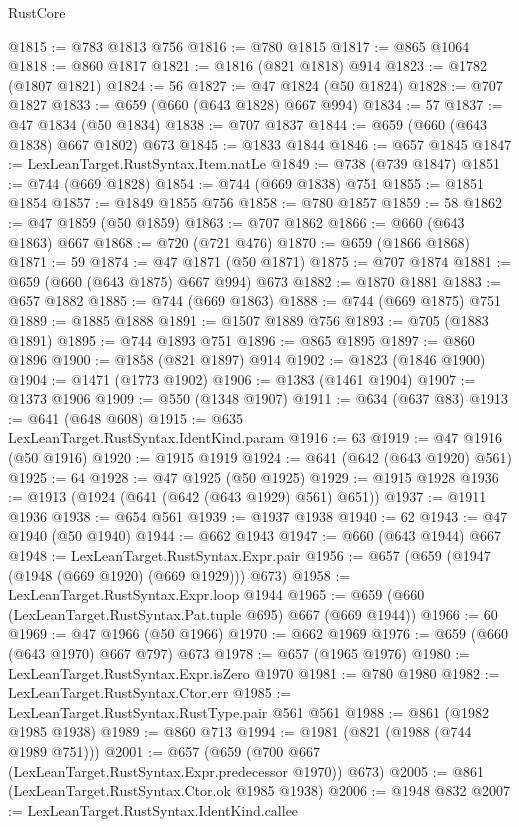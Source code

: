 \begin{lexlean}{RustCore}
\begin{coremodule}
@1815 := @783 @1813 @756
@1816 := @780 @1815
@1817 := @865 @1064
@1818 := @860 @1817
@1821 := @1816 (@821 @1818) @914
@1823 := @1782 (@1807 @1821)
@1824 := 56
@1827 := @47 @1824 (@50 @1824)
@1828 := @707 @1827
@1833 := @659 (@660 (@643 @1828) @667 @994)
@1834 := 57
@1837 := @47 @1834 (@50 @1834)
@1838 := @707 @1837
@1844 := @659 (@660 (@643 @1838) @667 @1802) @673
@1845 := @1833 @1844
@1846 := @657 @1845
@1847 := LexLeanTarget.RustSyntax.Item.natLe
@1849 := @738 (@739 @1847)
@1851 := @744 (@669 @1828)
@1854 := @744 (@669 @1838) @751
@1855 := @1851 @1854
@1857 := @1849 @1855 @756
@1858 := @780 @1857
@1859 := 58
@1862 := @47 @1859 (@50 @1859)
@1863 := @707 @1862
@1866 := @660 (@643 @1863) @667
@1868 := @720 (@721 @476)
@1870 := @659 (@1866 @1868)
@1871 := 59
@1874 := @47 @1871 (@50 @1871)
@1875 := @707 @1874
@1881 := @659 (@660 (@643 @1875) @667 @994) @673
@1882 := @1870 @1881
@1883 := @657 @1882
@1885 := @744 (@669 @1863)
@1888 := @744 (@669 @1875) @751
@1889 := @1885 @1888
@1891 := @1507 @1889 @756
@1893 := @705 (@1883 @1891)
@1895 := @744 @1893 @751
@1896 := @865 @1895
@1897 := @860 @1896
@1900 := @1858 (@821 @1897) @914
@1902 := @1823 (@1846 @1900)
@1904 := @1471 (@1773 @1902)
@1906 := @1383 (@1461 @1904)
@1907 := @1373 @1906
@1909 := @550 (@1348 @1907)
@1911 := @634 (@637 @83)
@1913 := @641 (@648 @608)
@1915 := @635 LexLeanTarget.RustSyntax.IdentKind.param
@1916 := 63
@1919 := @47 @1916 (@50 @1916)
@1920 := @1915 @1919
@1924 := @641 (@642 (@643 @1920) @561)
@1925 := 64
@1928 := @47 @1925 (@50 @1925)
@1929 := @1915 @1928
@1936 := @1913 (@1924 (@641 (@642 (@643 @1929) @561) @651))
@1937 := @1911 @1936
@1938 := @654 @561
@1939 := @1937 @1938
@1940 := 62
@1943 := @47 @1940 (@50 @1940)
@1944 := @662 @1943
@1947 := @660 (@643 @1944) @667
@1948 := LexLeanTarget.RustSyntax.Expr.pair
@1956 := @657 (@659 (@1947 (@1948 (@669 @1920) (@669 @1929))) @673)
@1958 := LexLeanTarget.RustSyntax.Expr.loop @1944
@1965 := @659 (@660 (LexLeanTarget.RustSyntax.Pat.tuple @695) @667 (@669 @1944))
@1966 := 60
@1969 := @47 @1966 (@50 @1966)
@1970 := @662 @1969
@1976 := @659 (@660 (@643 @1970) @667 @797) @673
@1978 := @657 (@1965 @1976)
@1980 := LexLeanTarget.RustSyntax.Expr.isZero @1970
@1981 := @780 @1980
@1982 := LexLeanTarget.RustSyntax.Ctor.err
@1985 := LexLeanTarget.RustSyntax.RustType.pair @561 @561
@1988 := @861 (@1982 @1985 @1938)
@1989 := @860 @713
@1994 := @1981 (@821 (@1988 (@744 @1989 @751)))
@2001 := @657 (@659 (@700 @667 (LexLeanTarget.RustSyntax.Expr.predecessor @1970)) @673)
@2005 := @861 (LexLeanTarget.RustSyntax.Ctor.ok @1985 @1938)
@2006 := @1948 @832
@2007 := LexLeanTarget.RustSyntax.IdentKind.callee

\end{coremodule}
\end{lexlean}
